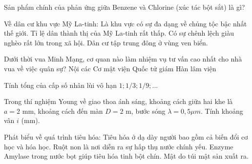 \begin{ex}
    Sản phẩm chính của phản ứng giữa Benzene và Chlorine (xúc tác bột sắt) là gì?

\end{ex}

\begin{ex}
    Về dân cư khu vực Mỹ La-tinh:
    \choiceTF
    {\True Là khu vực có sự đa dạng về chủng tộc bậc nhất thế giới.}
    {Tỉ lệ dân thành thị của Mỹ La-tinh rất thấp.}
    {\True Có sự chênh lệch giàu nghèo rất lớn trong xã hội.}
    {\True Dân cư tập trung đông ở vùng ven biển.}
\end{ex}

\begin{ex}
    Dưới thời vua Minh Mạng, cơ quan nào làm nhiệm vụ tư vấn cao nhất cho nhà vua về việc quân sự?
    \choice
    {Nội các}
    {\True Cơ mật viện}
    {Quốc tử giám}
    {Hàn lâm viện}
\end{ex}

\begin{ex}
    Tính tổng của cấp số nhân lùi vô hạn $1; 1/3; 1/9; ...$
\end{ex}

\begin{ex}
    Trong thí nghiệm Young về giao thoa ánh sáng, khoảng cách giữa hai khe là $a = 2$ mm, khoảng cách đến màn $D = 2$ m, bước sóng $\lambda = 0,5 \mu m$. Tính khoảng vân $i$ (mm).
\end{ex}

\begin{ex}
    Phát biểu về quá trình tiêu hóa:
    \choiceTF
    {\True Tiêu hóa ở dạ dày người bao gồm cả biến đổi cơ học và hóa học.}
    {Ruột non là nơi diễn ra sự hấp thụ nước chính yếu.}
    {\True Enzyme Amylase trong nước bọt giúp tiêu hóa tinh bột chín.}
    {Mật do túi mật sản xuất ra.}
\end{ex}

